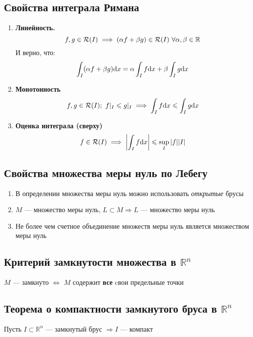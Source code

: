 \documentclass[a4paper]{article}
\begin{document}
\subsection{Свойства интеграла Римана}
\begin{enumerate}
    \item \textbf{Линейность.}
    \begin{equation*}
        f, g \in \mathcal{R}(I) \implies (\alpha f + \beta g)\in \mathcal{R}(I)\ \forall \alpha, \beta \in \R
    \end{equation*}
    И верно, что:
    \begin{equation*}
            \int_I(\alpha f + \beta g)\text{d}x = \alpha\int_I f\text{d}x + \beta\int_Ig\text{d}x
    \end{equation*}
    \item \textbf{Монотонность}
    \begin{equation*}
        f, g\in \mathcal{R}(I);\ f|_I\leqslant g|_I \implies \int_If\text{d}x \leqslant \int_Ig\text{d}x
    \end{equation*}
    \item \textbf{Оценка интеграла (сверху)}
    \begin{equation*}
        f\in \mathcal{R}(I) \implies \left|\int_If\text{d}x\right| \leqslant\sup\limits_{I}|f||I|
    \end{equation*}
\end{enumerate}

\subsection{Свойства множества меры нуль по Лебегу}
\begin{enumerate}
    \item В определении множества меры нуль можно использовать \textit{открытые} брусы
    \item $M$ — множество меры нуль, $L\subset M\Longrightarrow L$ — множество меры нуль
    \item Не более чем счетное объединение множеств меры нуль является множеством меры нуль
\end{enumerate}

\subsection{Критерий замкнутости множества в $\mathbb{R}^n$}
\theorem $M$ — замкнуто $\Longleftrightarrow$ $M$ содержит \textbf{все} cвои предельные точки

\subsection{Теорема о компактности замкнутого бруса в $\mathbb{R}^n$}
\theorem Пусть $I\subset\mathbb{R}^n$ — замкнутый брус $\Longrightarrow I$ — компакт
\end{document}
